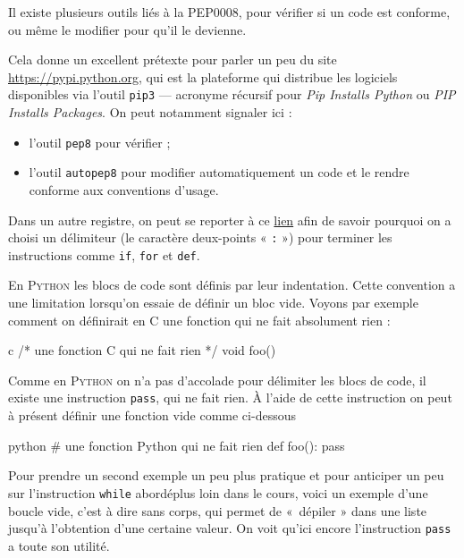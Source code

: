 Il existe plusieurs outils liés à la PEP0008, pour vérifier si un code est conforme, ou même le modifier pour qu'il le devienne.

Cela donne un excellent prétexte pour parler un peu du site \url{https://pypi.python.org}, qui est la plateforme qui distribue les logiciels disponibles via l'outil \texttt{pip3} --- acronyme récursif pour \textit{Pip Installs Python} ou \textit{PIP Installs Packages}. On peut notamment signaler ici :
\begin{itemize}
\item l'outil \texttt{pep8} pour vérifier ;
\item l'outil \texttt{autopep8} pour modifier automatiquement un code et le rendre conforme aux conventions d'usage.
\end{itemize}

Dans un autre registre, on peut se reporter à ce \href{https://docs.python.org/3/faq/design.html\#why-are-colons-required-for-the-if-while-def-class-statements}{lien} afin de savoir pourquoi on a choisi un délimiteur (le caractère deux-points « \texttt{:} ») pour terminer les instructions comme \texttt{if}, \texttt{for} et \texttt{def}.


En \textsc{Python} les blocs de code sont définis par leur indentation. Cette convention a une limitation lorsqu'on essaie de définir un bloc vide. Voyons par exemple comment on définirait en C une fonction qui ne fait absolument rien :

\begin{codebox}{c}
/* une fonction C qui ne fait rien */
void foo() {}
\end{codebox}

Comme en \textsc{Python} on n'a pas d'accolade pour délimiter les blocs de code, il existe une instruction \texttt{pass}, qui ne fait rien. À l'aide de cette instruction on peut à présent définir une fonction vide comme ci-dessous

\begin{codebox}{python}
# une fonction Python qui ne fait rien
def foo():
    pass
\end{codebox}

Pour prendre un second exemple un peu plus pratique et pour anticiper un peu sur l'instruction \texttt{while} abordéplus loin dans le cours, voici un exemple d'une boucle vide, c'est à dire sans corps, qui permet de «~dépiler » dans une liste jusqu'à l'obtention d'une certaine valeur. On voit qu'ici encore l'instruction \texttt{pass} a toute son utilité.

